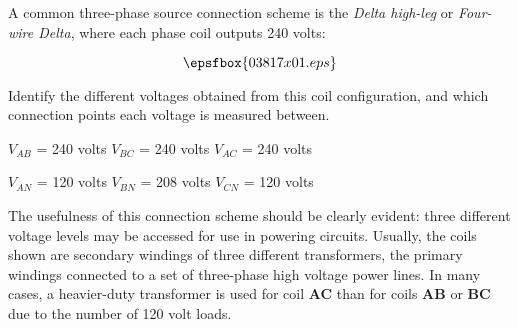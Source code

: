 

A common three-phase source connection scheme is the {\it Delta high-leg} or {\it Four-wire Delta}, where each phase coil outputs 240 volts:

$$\epsfbox{03817x01.eps}$$

Identify the different voltages obtained from this coil configuration, and which connection points each voltage is measured between.







$V_{AB}$ = 240 volts \hskip 80pt $V_{BC}$ = 240 volts \hskip 80pt $V_{AC}$ = 240 volts

\vskip 10pt

$V_{AN}$ = 120 volts \hskip 80pt $V_{BN}$ = 208 volts \hskip 80pt$V_{CN}$ = 120 volts







The usefulness of this connection scheme should be clearly evident: three different voltage levels may be accessed for use in powering circuits.  Usually, the coils shown are secondary windings of three different transformers, the primary windings connected to a set of three-phase high voltage power lines.  In many cases, a heavier-duty transformer is used for coil {\bf AC} than for coils {\bf AB} or {\bf BC} due to the number of 120 volt loads.




